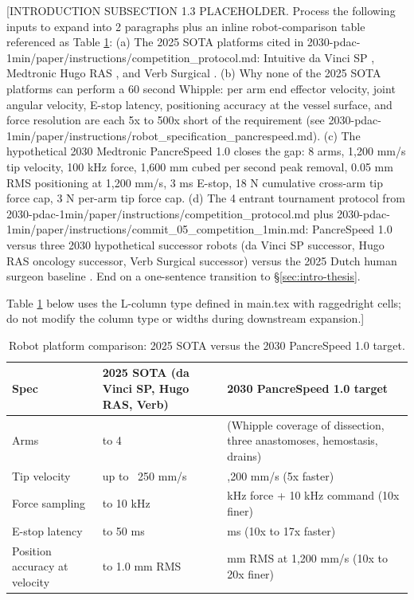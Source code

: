 [INTRODUCTION SUBSECTION 1.3 PLACEHOLDER. Process the following inputs to expand into 2 paragraphs plus an inline robot-comparison table referenced as Table \ref{tab:robot-comparison}:
(a) The 2025 SOTA platforms cited in 2030-pdac-1min/paper/instructions/competition_protocol.md: Intuitive da Vinci SP \cite{intuitive-davinci-sp}, Medtronic Hugo RAS \cite{medtronic-hugo-ras}, and Verb Surgical \cite{verb-surgical}.
(b) Why none of the 2025 SOTA platforms can perform a 60 second Whipple: per arm end effector velocity, joint angular velocity, E-stop latency, positioning accuracy at the vessel surface, and force resolution are each 5x to 500x short of the requirement (see 2030-pdac-1min/paper/instructions/robot_specification_pancrespeed.md).
(c) The hypothetical 2030 Medtronic PancreSpeed 1.0 closes the gap: 8 arms, 1,200 mm/s tip velocity, 100 kHz force, 1,600 mm cubed per second peak removal, 0.05 mm RMS positioning at 1,200 mm/s, 3 ms E-stop, 18 N cumulative cross-arm tip force cap, 3 N per-arm tip force cap.
(d) The 4 entrant tournament protocol from 2030-pdac-1min/paper/instructions/competition_protocol.md plus 2030-pdac-1min/paper/instructions/commit_05_competition_1min.md: PancreSpeed 1.0 versus three 2030 hypothetical successor robots (da Vinci SP successor, Hugo RAS oncology successor, Verb Surgical successor) versus the 2025 Dutch human surgeon baseline \cite{DutchCohort2025Whipple}.
End on a one-sentence transition to \S \ref{sec:intro-thesis}.

Table \ref{tab:robot-comparison} below uses the L-column type defined in main.tex with raggedright cells; do not modify the column type or widths during downstream expansion.]

\begin{table}[H]
\caption{Robot platform comparison: 2025 SOTA versus the 2030 PancreSpeed 1.0 target.}
\label{tab:robot-comparison}
\centering
\begin{tabular}{>{\raggedright\arraybackslash}p{3.4cm} >{\raggedright\arraybackslash}p{4.6cm} >{\raggedright\arraybackslash}p{5.4cm}}
\toprule
\textbf{Spec} & \textbf{2025 SOTA (da Vinci SP, Hugo RAS, Verb)} & \textbf{2030 PancreSpeed 1.0 target} \\
\midrule
  Arms & 1 to 4 \cite{intuitive-davinci-sp, medtronic-hugo-ras, verb-surgical} & 8 (Whipple coverage of dissection, three anastomoses, hemostasis, drains) \\
  Tip velocity & up to ~250 mm/s & 1,200 mm/s (5x faster) \\
  Force sampling & 1 to 10 kHz & 100 kHz force + 10 kHz command (10x finer) \\
  E-stop latency & 30 to 50 ms & 3 ms (10x to 17x faster) \\
  Position accuracy at velocity & 0.5 to 1.0 mm RMS & 0.05 mm RMS at 1,200 mm/s (10x to 20x finer) \\
\bottomrule
\end{tabular}
\end{table}

